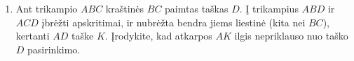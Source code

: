 \begin{enumerate}
\item Ant trikampio $ABC$ kraštinės $BC$ paimtas taškas $D$.
  Į trikampius $ABD$ ir $ACD$ įbrėžti apskritimai, ir
  nubrėžta bendra jiems liestinė (kita nei $BC$), kertanti
  $AD$ taške $K$. Įrodykite, kad atkarpos $AK$ ilgis
  nepriklauso nuo taško $D$ pasirinkimo.
\end{enumerate}

